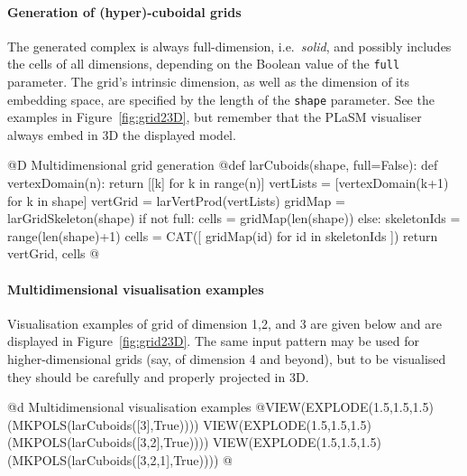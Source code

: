 \documentclass[11pt,oneside]{article}	%
\begin{document}
\paragraph{Generation of (hyper)-cuboidal grids}

The generated complex is always full-dimension, i.e.~\emph{solid}, and possibly includes the cells of all dimensions, depending on the Boolean value of the \texttt{full} parameter.
The grid's intrinsic dimension, as well as the dimension of its embedding space, are specified by the length of the \texttt{shape} parameter. See the examples in Figure~\ref{fig:grid23D}, but remember that the PLaSM visualiser always embed in 3D the displayed model. 

@D Multidimensional grid generation
@{def larCuboids(shape, full=False):
	def vertexDomain(n): 
		return [[k] for k in range(n)]
	vertLists = [vertexDomain(k+1) for k in shape]
	vertGrid = larVertProd(vertLists)
	gridMap = larGridSkeleton(shape)
	if not full: 
		cells = gridMap(len(shape))
	else:
		skeletonIds = range(len(shape)+1)
		cells = CAT([ gridMap(id) for id in skeletonIds ])
	return vertGrid, cells
@}

\paragraph{Multidimensional visualisation examples}
Visualisation examples of grid of dimension 1,2, and 3 are given below and are displayed  in Figure~\ref{fig:grid23D}. The same input pattern may be used for higher-dimensional grids (say, of dimension 4 and beyond), but to be visualised they should be carefully and properly projected in 3D.

@d Multidimensional visualisation examples
@{VIEW(EXPLODE(1.5,1.5,1.5)(MKPOLS(larCuboids([3],True))))
VIEW(EXPLODE(1.5,1.5,1.5)(MKPOLS(larCuboids([3,2],True))))
VIEW(EXPLODE(1.5,1.5,1.5)(MKPOLS(larCuboids([3,2,1],True))))
@}
\end{document}

